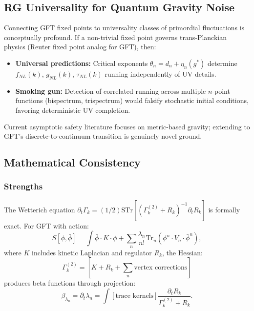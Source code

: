 \documentclass[12pt,a4paper]{article}
\begin{document}
\subsection{RG Universality for Quantum Gravity Noise}

Connecting GFT fixed points to universality classes of primordial fluctuations is conceptually profound. If a non-trivial fixed point governs trans-Planckian physics (Reuter fixed point analog for GFT), then:

\begin{itemize}
\item \textbf{Universal predictions:} Critical exponents \(\theta_n = d_n + \eta_n(g^*)\) determine \(f_{NL}(k)\), \(g_{NL}(k)\), \(\tau_{NL}(k)\) running independently of UV details.

\item \textbf{Smoking gun:} Detection of correlated running across multiple \(n\)-point functions (bispectrum, trispectrum) would falsify stochastic initial conditions, favoring deterministic UV completion.
\end{itemize}

Current asymptotic safety literature focuses on metric-based gravity; extending to GFT's discrete-to-continuum transition is genuinely novel ground.

\subsection{Mathematical Consistency}

\subsubsection{Strengths}

The Wetterich equation \(\partial_t \Gamma_k = (1/2) \text{STr}[(\Gamma_k^{(2)} + R_k)^{-1} \partial_t R_k]\) is formally exact. For GFT with action:
\begin{equation}
S[\phi, \bar{\phi}] = \int \bar{\phi} \cdot K \cdot \phi + \sum_n \frac{\lambda_n}{n!} \text{Tr}_n(\phi^n \cdot V_n \cdot \bar{\phi}^n),
\end{equation}
where \(K\) includes kinetic Laplacian and regulator \(R_k\), the Hessian:
\begin{equation}
\Gamma_k^{(2)} = [K + R_k + \sum_n \text{vertex corrections}]
\end{equation}
produces beta functions through projection:
\begin{equation}
\beta_{\lambda_n} = \partial_t \lambda_n = \int [\text{trace kernels}] \frac{\partial_t R_k}{\Gamma_k^{(2)} + R_k}.
\end{equation}
\end{document}
